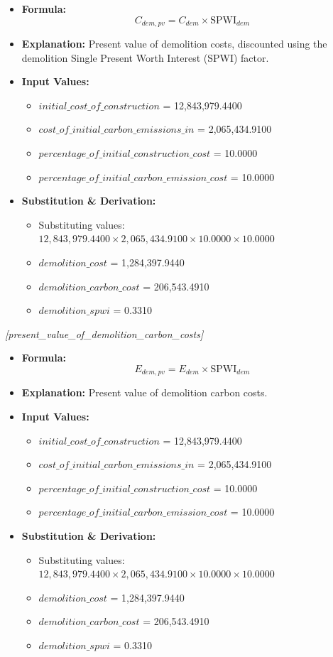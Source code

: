 \documentclass[12pt,a4paper]{article}
\begin{document}
\begin{itemize}
  \item \textbf{Formula:} $$C_{dem,pv} = C_{dem} \times \text{SPWI}_{dem}$$
  \item \textbf{Explanation:} Present value of demolition costs, discounted using the demolition Single Present Worth Interest (SPWI) factor.
  \item \textbf{Input Values:}
  \begin{itemize}
    \item $initial\_cost\_of\_construction$ = 12,843,979.4400
    \item $cost\_of\_initial\_carbon\_emissions\_in$ = 2,065,434.9100
    \item $percentage\_of\_initial\_construction\_cost$ = 10.0000
    \item $percentage\_of\_initial\_carbon\_emission\_cost$ = 10.0000
  \end{itemize}
  \item \textbf{Substitution \& Derivation:}
  \begin{itemize}
    \item Substituting values: $12,843,979.4400 \times 2,065,434.9100 \times 10.0000 \times 10.0000$
    \item $demolition\_cost$ = 1,284,397.9440
    \item $demolition\_carbon\_cost$ = 206,543.4910
    \item $demolition\_spwi$ = 0.3310
  \end{itemize}
\end{itemize}


\textit{[present\_value\_of\_demolition\_carbon\_costs]}

\begin{itemize}
  \item \textbf{Formula:} $$E_{dem,pv} = E_{dem} \times \text{SPWI}_{dem}$$
  \item \textbf{Explanation:} Present value of demolition carbon costs.
  \item \textbf{Input Values:}
  \begin{itemize}
    \item $initial\_cost\_of\_construction$ = 12,843,979.4400
    \item $cost\_of\_initial\_carbon\_emissions\_in$ = 2,065,434.9100
    \item $percentage\_of\_initial\_construction\_cost$ = 10.0000
    \item $percentage\_of\_initial\_carbon\_emission\_cost$ = 10.0000
  \end{itemize}
  \item \textbf{Substitution \& Derivation:}
  \begin{itemize}
    \item Substituting values: $12,843,979.4400 \times 2,065,434.9100 \times 10.0000 \times 10.0000$
    \item $demolition\_cost$ = 1,284,397.9440
    \item $demolition\_carbon\_cost$ = 206,543.4910
    \item $demolition\_spwi$ = 0.3310
  \end{itemize}
\end{itemize}
\end{document}
